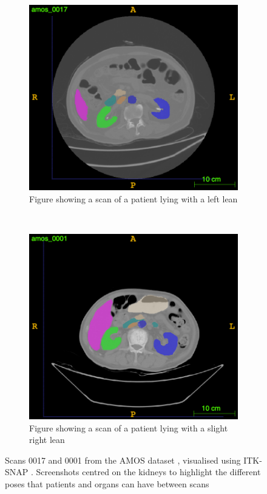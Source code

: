 \documentclass{l4proj}
\begin{document}
\begin{figure}[htb]
    \begin{subfigure}[b]{0.45\textwidth}
        \includegraphics[width=\textwidth]{images/patient_pose_left.png}
        \caption{Figure showing a scan of a patient lying with a left lean}
        \label{fig:scan_differences_left}
    \end{subfigure}
    ~
    \begin{subfigure}[b]{0.45\textwidth}
        \includegraphics[width=\textwidth]{images/patient_pose_right.png}
        \caption{Figure showing a scan of a patient lying with a slight right lean}
        \label{fig:scan_differences_right}
    \end{subfigure}

    \caption{Scans 0017 and 0001 from the AMOS dataset \citep{ji2022amos}, visualised using ITK-SNAP \citep{itksnap}. Screenshots centred on the kidneys to highlight the different poses that patients and organs can have between scans} \label{fig:scan_differences}
\end{figure}
\end{document}
